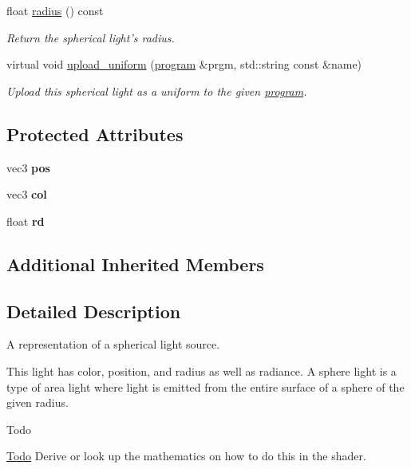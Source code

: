\begin{DoxyCompactItemize}
float \hyperlink{classgfx_1_1sphere__light_a5602a156f7b035c731ca2539897663f2}{radius} () const 
\begin{DoxyCompactList}\small\item\em Return the spherical light's radius. \end{DoxyCompactList}\item 
virtual void \hyperlink{classgfx_1_1sphere__light_a357d9e69656557f7055bfbe6e6952498}{upload\-\_\-uniform} (\hyperlink{classgfx_1_1program}{program} \&prgm, std\-::string const \&name)
\begin{DoxyCompactList}\small\item\em Upload this spherical light as a uniform to the given \hyperlink{classgfx_1_1program}{program}. \end{DoxyCompactList}\end{DoxyCompactItemize}
\subsection*{Protected Attributes}
\begin{DoxyCompactItemize}
\item 
\hypertarget{classgfx_1_1sphere__light_a826fce05511195478333e9cc76f6992b}{vec3 {\bfseries pos}}\label{classgfx_1_1sphere__light_a826fce05511195478333e9cc76f6992b}

\item 
\hypertarget{classgfx_1_1sphere__light_a95417d37ffb217bdbd9370d26698ad36}{vec3 {\bfseries col}}\label{classgfx_1_1sphere__light_a95417d37ffb217bdbd9370d26698ad36}

\item 
\hypertarget{classgfx_1_1sphere__light_a4851c346ebdd70161803007cd8f02ab7}{float {\bfseries rd}}\label{classgfx_1_1sphere__light_a4851c346ebdd70161803007cd8f02ab7}

\end{DoxyCompactItemize}
\subsection*{Additional Inherited Members}


\subsection{Detailed Description}
A representation of a spherical light source. 

This light has color, position, and radius as well as radiance. A sphere light is a type of area light where light is emitted from the entire surface of a sphere of the given radius. \begin{DoxyRefDesc}{Todo}
\item[\hyperlink{todo__todo000024}{Todo}]Derive or look up the mathematics on how to do this in the shader. \end{DoxyRefDesc}


